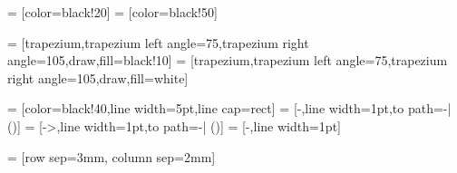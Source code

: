  = [color=black!20]
 = [color=black!50]

\newcommand{\dataRightAngle}{105}
\newcommand{\dataLeftAngle}{75}

 = [trapezium,trapezium left angle=\dataLeftAngle,trapezium right angle=\dataRightAngle,draw,fill=black!10]
 = [trapezium,trapezium left angle=\dataLeftAngle,trapezium right angle=\dataRightAngle,draw,fill=white]

 = [color=black!40,line width=5pt,line cap=rect]
 = [-,line width=1pt,to path={-| (\tikztotarget)}]
 = [->,line width=1pt,to path={-| (\tikztotarget)}]
 = [-,line width=1pt]

 = [row sep=3mm, column sep=2mm]



\newcommand{\MultilineComponent}[2]
{
	\begin{minipage}{#1}
	\begin{center}
		#2
	\end{center}
	\end{minipage}
}

\newcommand{\TwolineComponent}[3]
{
	\begin{minipage}{#1}
	\begin{center}
		#2 \linebreak #3
	\end{center}
	\end{minipage}
}

\newcommand{\ThreelineComponent}[4]
{
	\begin{minipage}{#1}
	\begin{center}
		#2 \linebreak #3 \linebreak #4
	\end{center}
	\end{minipage}
}

\newcommand{\MultiColumnComponent}[5]
{
	\begin{minipage}{#1}
	\begin{center}
	#2 \linebreak #3
	\end{center}
	\begin{minipage}{0.49\textwidth}
	\begin{center}
	#4
	\end{center}
	\end{minipage}
	\begin{minipage}{0.49\textwidth}
	\begin{center}
	#5
	\end{center}
	\end{minipage}
	\end{minipage}
}

\def\arraystretch{1.3}
